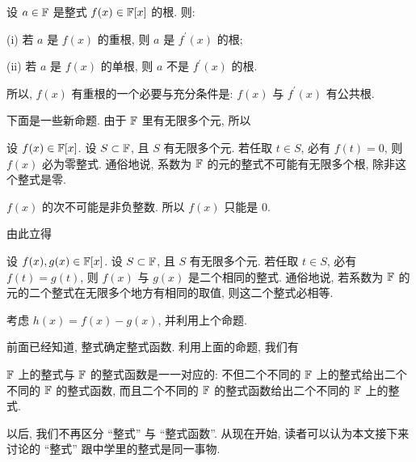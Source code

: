 \begin{proposition}
    设 $a \in \mathbb{F}$ 是整式 $f(x) \in \mathbb{F}[x]$ 的根. 则:

    (i) 若 $a$ 是 $f(x)$ 的重根, 则 $a$ 是 $f^{\prime} (x)$ 的根;

    (ii) 若 $a$ 是 $f(x)$ 的单根, 则 $a$ 不是 $f^{\prime} (x)$ 的根.

    所以, $f(x)$ 有重根的一个必要与充分条件是: $f(x)$ 与 $f^{\prime} (x)$ 有公共根.
\end{proposition}

下面是一些新命题. 由于 $\mathbb{F}$ 里有无限多个元, 所以

\begin{proposition}
    设 $f(x) \in \mathbb{F}[x]$. 设 $S \subset \mathbb{F}$, 且 $S$ 有无限多个元. 若任取 $t \in S$, 必有 $f(t) = 0$, 则 $f(x)$ 必为零整式. 通俗地说, 系数为 $\mathbb{F}$ 的元的整式不可能有无限多个根, 除非这个整式是零.
\end{proposition}

\begin{pf}
    $f(x)$ 的次不可能是非负整数. 所以 $f(x)$ 只能是 $0$.
\end{pf}

由此立得

\begin{proposition}
    设 $f(x),g(x) \in \mathbb{F}[x]$. 设 $S \subset \mathbb{F}$, 且 $S$ 有无限多个元. 若任取 $t \in S$, 必有 $f(t) = g(t)$, 则 $f(x)$ 与 $g(x)$ 是二个相同的整式. 通俗地说, 若系数为 $\mathbb{F}$ 的元的二个整式在无限多个地方有相同的取值, 则这二个整式必相等.
\end{proposition}

\begin{pf}
    考虑 $h(x) = f(x) - g(x)$, 并利用上个命题.
\end{pf}

前面已经知道, 整式确定整式函数. 利用上面的命题, 我们有

\begin{proposition}
    $\mathbb{F}$ 上的整式与 $\mathbb{F}$ 的整式函数是一一对应的: 不但二个不同的 $\mathbb{F}$ 上的整式给出二个不同的 $\mathbb{F}$ 的整式函数, 而且二个不同的 $\mathbb{F}$ 的整式函数给出二个不同的 $\mathbb{F}$ 上的整式.
\end{proposition}

\begin{remark}
    以后, 我们不再区分 ``整式'' 与 ``整式函数''. 从现在开始, 读者可以认为本文接下来讨论的 ``整式'' 跟中学里的整式是同一事物.
\end{remark}
